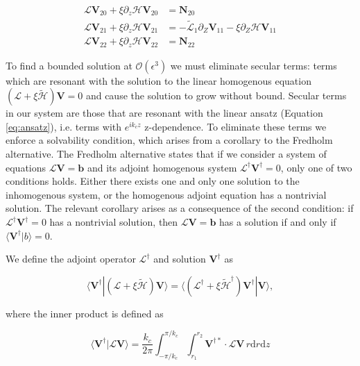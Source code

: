 \documentclass{emulateapj}
\newcommand{\beq}{\begin{equation}}
\newcommand{\eeq}{\end{equation}}
\begin{document}
\begin{align}
\mathcal{L}\mathbf{V}_{20} + \xi \partial_z \mathcal{H} \mathbf{V}_{20} & = \mathbf{N}_{20}\\
\mathcal{L}\mathbf{V}_{21} + \xi \partial_z \mathcal{H} \mathbf{V}_{21} & = - \widetilde{\mathcal{L}}_1 \partial_Z \mathbf{V}_{11} - \xi \partial_Z \mathcal{H} \mathbf{V}_{11} \\
\mathcal{L}\mathbf{V}_{22} + \xi \partial_z \mathcal{H} \mathbf{V}_{22} & = \mathbf{N}_{22}
\end{align}



To find a bounded solution at $\mathcal{O}(\epsilon^3)$ we must eliminate secular terms: terms which are resonant with the solution to the linear homogenous equation $(\mathcal{L} + \xi \widetilde{\mathcal{H}}) \mathbf{V} = 0$ and cause the solution to grow without bound. Secular terms in our system are those that are resonant with the linear ansatz (Equation \ref{eq:ansatz}), i.e. terms with $e^{i k_c z}$ z-dependence. To eliminate these terms we enforce a solvability condition, which arises from a corollary to the Fredholm alternative. The Fredholm alternative states that if we consider a system of equations $\mathcal{L} \mathbf{V} = \mathbf{b}$ and its adjoint homogenous system $\mathcal{L}^\dagger \mathbf{V}^\dagger = 0$, only one of two conditions holds. Either there exists one and only one solution to the inhomogenous system, or the homogenous adjoint equation has a nontrivial solution. The relevant corollary arises as a consequence of the second condition: if $\mathcal{L}^\dagger \mathbf{V}^\dagger = 0$ has a nontrivial solution, then $\mathcal{L} \mathbf{V} = \mathbf{b}$ has a solution if and only if $\langle \mathbf{V}^\dagger | b \rangle = 0$. 

We define the adjoint operator $\mathcal{L}^\dagger$ and solution $\mathbf{V}^\dagger$ as 

\beq
\langle \mathbf{V^\dagger} | (\mathcal{L} + \xi \widetilde{\mathcal{H}}) \mathbf{V} \rangle = \langle (\mathcal{L}^\dagger + \xi \widetilde{\mathcal{H}}^\dagger) \mathbf{V}^\dagger | \mathbf{V} \rangle,
\eeq

where the inner product is defined as 

\beq\label{eq:inner_product_def}
\langle \mathbf{V^\dagger} | \mathcal{L} \mathbf{V} \rangle = \frac{k_c}{2\pi} \int_{-\pi/k_c}^{\pi/k_c} \int_{r_1}^{r_2} \mathbf{V}^{\dagger*} \cdot \mathcal{L} \mathbf{V} \, r \mathrm{d} r \mathrm{d} z
\eeq
\end{document}
